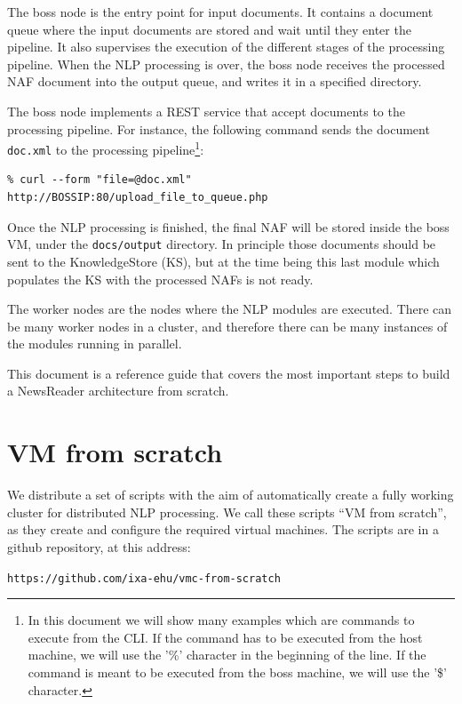 \documentclass[a4]{article}
\begin{document}
The boss node is the entry point for input documents. It contains a document
queue where the input documents are stored and wait until they enter the
pipeline. It also supervises the execution of the different stages of the
processing pipeline. When the NLP processing is over, the boss node receives
the processed NAF document into the output queue, and writes it in a
specified directory.

The boss node implements a REST service that accept documents to the
processing pipeline. For instance, the following command sends the document
\texttt{doc.xml} to the processing pipeline\footnote{In this document we
  will show many examples which are commands to execute from the CLI. If the
  command has to be executed from the host machine, we will use the '\%'
  character in the beginning of the line. If the command is meant to be
  executed from the boss machine, we will use the '\$' character.}:

\begin{verbatim}
% curl --form "file=@doc.xml" http://BOSSIP:80/upload_file_to_queue.php
\end{verbatim}

Once the NLP processing is finished, the final NAF will be stored inside the
boss VM, under the \texttt{docs/output} directory. In principle those
documents should be sent to the KnowledgeStore (KS), but at the time being
this last module which populates the KS with the processed NAFs is not
ready.

The worker nodes are the nodes where the NLP modules are executed. There can
be many worker nodes in a cluster, and therefore there can be many instances
of the modules running in parallel.

This document is a reference guide that covers the most important steps to
build a NewsReader architecture from scratch.

\section{VM from scratch}
\label{sec:vm-from-scratch}

We distribute a set of scripts with the aim of automatically create a fully
working cluster for distributed NLP processing. We call these scripts ``VM
from scratch'', as they create and configure the required virtual
machines. The scripts are in a github repository, at this address:

\begin{center}
  \texttt{https://github.com/ixa-ehu/vmc-from-scratch}
\end{center}
\end{document}
